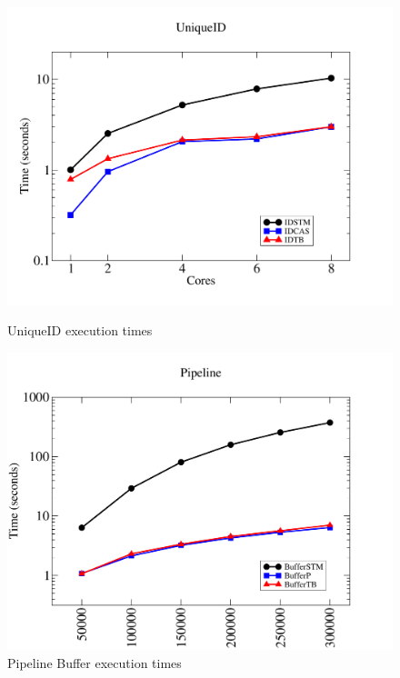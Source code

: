 \documentclass{llncs}
\begin{document}
\begin{figure}[ht]
\vspace{-5mm}
\centering
\begin{minipage}[b]{0.48\textwidth}
        \centering
                \includegraphics[width=\textwidth]{UniqueID.pdf}
        \caption{UniqueID execution times}
        \label{fig:uniqueid}
\end{minipage}
\quad
\begin{minipage}[b]{0.48\textwidth}
        \centering
                \includegraphics[width=\textwidth]{pipeline.pdf}
        \caption{Pipeline Buffer execution times}
        \label{fig:pipeline}
\end{minipage}
\end{figure}
\end{document}
